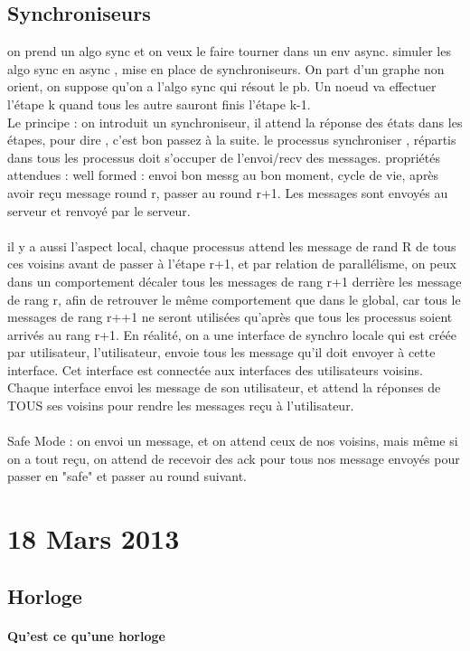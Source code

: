 \documentclass{article}
\begin{document}
\subsection{Synchroniseurs}
on prend un algo sync et on veux le faire tourner dans un env async. simuler les algo sync en async , mise en place de synchroniseurs. On part d'un graphe non orient, on suppose qu'on a l'algo sync qui résout le pb. Un noeud va effectuer l'étape k quand tous les autre sauront finis l'étape k-1.\\Le principe : on introduit un synchroniseur, il attend la réponse des états dans les étapes, pour dire , c'est bon passez à la suite. le processus synchroniser , répartis dans tous les processus doit s'occuper de l'envoi/recv des messages. propriétés attendues : well formed : envoi bon messg au bon moment, cycle de vie, après avoir reçu message round r, passer au round r+1. Les messages sont envoyés au serveur et renvoyé par le serveur.\\\\ il y a aussi l'aspect local, chaque processus attend les message de rand R de tous ces voisins avant de passer à l'étape r+1, et par relation de parallélisme, on peux dans un comportement décaler tous les messages de rang r+1 derrière les message de rang r, afin de retrouver le même comportement que dans le global, car tous le messages de rang r++1 ne seront utilisées qu’après que tous les processus soient arrivés au rang r+1. En réalité, on a une interface de synchro locale qui est créée par utilisateur, l'utilisateur, envoie tous les message qu'il doit envoyer à cette interface. Cet interface est connectée aux interfaces des utilisateurs voisins. Chaque interface envoi les message de son utilisateur, et attend la réponses de TOUS ses voisins pour rendre les messages reçu à l'utilisateur. \\\\Safe Mode : on envoi un message, et on attend ceux de nos voisins,  mais même si on a tout reçu, on attend de recevoir des ack pour tous nos message envoyés pour passer en "safe" et passer au round suivant.

\section{18 Mars 2013}
\subsection{Horloge}  
\paragraph{Qu'est ce qu'une horloge}
\end{document}
